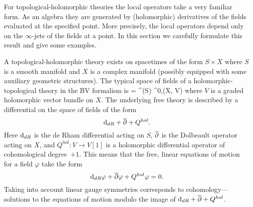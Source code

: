 For topological-holomorphic theories the local operators take a very familiar form.
As an algebra they are generated by (holomorphic) derivatives of the fields evaluated at the specified point. 
More precisely, the local operators depend only on the $\infty$-jets of the fields at a point.
In this section we carefully formulate this result and give some examples.

\parsec[s:free]

%
%
A topological-holomorphic theory exists on spacetimes of the form $S \times X$ where $S$ is a smooth manifold and $X$ is a complex manifold (possibly equipped with some auxiliary geometric structures). 
The typical space of fields of a holomorphic-topological theory in the BV formalism is
\beqn\label{eqn:cE}
\cE = \Omega^\bu (S) \hotimes \Omega^{0,\bu}(X, V) 
\eeqn
where $V$ is a graded holomorphic vector bundle on $X$.
The underlying free theory is described by a differential on the space of fields of the form
\[
{\rm d}_{dR} + \overline{\partial} + Q^{hol} .
\]
Here ${\rm d}_{dR}$ is the de Rham differential acting on $S$, $\overline{\partial}$ is the Dolbeault operator acting on $X$, and $Q^{hol} \colon V \to V[1]$ is a holomorphic differential operator of cohomological degree~$+1$.
This means that the free, linear equations of motion for a field $\varphi$ take the form
\[
{\rm d}_{dR} \varphi + \overline{\partial} \varphi + Q^{hol} \varphi = 0 .
\]
Taking into account linear gauge symmetries corresponds to cohomology---solutions to the equations of motion modulo the image of ${\rm d}_{dR} + \overline{\partial} + Q^{hol}$.

